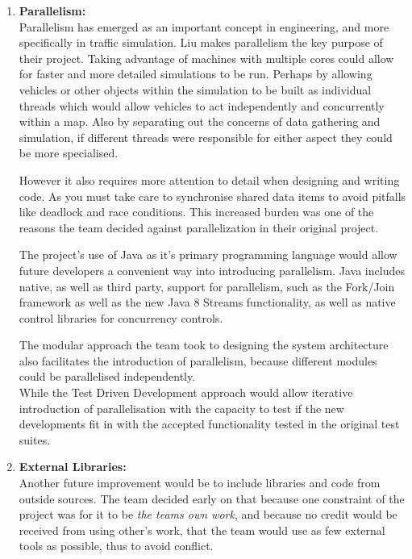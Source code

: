 \documentclass[11pt]{article}
\begin{document}
{\begin{enumerate}
	
	\item \textbf{Parallelism:}
	\\
	
	Parallelism has emerged as an important concept in engineering, and more specifically in traffic simulation. Liu \cite{website:phy-ntnu-traffic-simulation} makes parallelism the key purpose of their project. Taking advantage of machines with multiple cores could allow for faster and more detailed simulations to be run. Perhaps by allowing vehicles or other objects within the simulation to be built as individual threads which would allow vehicles to act independently and concurrently within a map. Also by separating out the concerns of data gathering and simulation, if different threads were responsible for either aspect they could be more specialised.
	
	However it also requires more attention to detail when designing and writing code. As you must take care to synchronise shared data items to avoid pitfalls like deadlock and race conditions. This increased burden was one of the reasons the team decided against parallelization in their original project.
	
	The project's use of Java as it's primary programming language would allow future developers a convenient way into introducing parallelism. Java includes native, as well as third party, support for parallelism, such as the Fork/Join framework\cite{LeaForkJoin} as well as the new Java 8 Streams functionality\cite{website:Oracle-Java-8}, as well as native control libraries for concurrency controls.
	
	The modular approach the team took to designing the system architecture also facilitates the introduction of parallelism, because different modules could be parallelised independently.
	\\While the Test Driven Development approach would allow iterative introduction of parallelisation with the capacity to test if the new developments fit in with the accepted functionality tested in the original test suites.\\
	
	\item \textbf{External Libraries:}
	\\
	
	Another future improvement would be to include libraries and code from outside sources. The team decided early on that because one constraint of the project was for it to be \textit{the teams own work}, and because no credit would be received from using other's work, that the team would use as few external tools as possible, thus to avoid conflict. 
	

\end{enumerate}}
\end{document}
